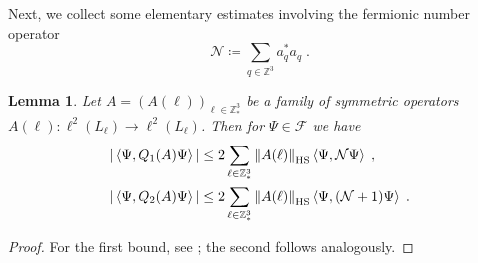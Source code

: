 \documentclass[12pt,a4paper]{article}
\numberwithin{equation}{section}
\newcommand{\cF}{\mathcal{F}}
\newcommand{\cN}{\mathcal{N}}
\newcommand{\1}{\mathbb{I}}
\newcommand{\HS}{\mathrm{HS}}
\newcommand{\Z}{\mathbb{Z}}
\newcommand{\NN}{\mathcal{N}}
\newcommand{\half}{\frac{1}{2}}
\newcommand{\eva}[1]{\left\langle #1 \right\rangle}
\theoremstyle{plain}
\newtheorem{lemma}[theorem]{Lemma}
\theoremstyle{definition}
\theoremstyle{remark}
\theoremstyle{plain}
\theoremstyle{definition}
\theoremstyle{remark}
\begin{document}
Next, we collect some elementary estimates involving the fermionic number operator
\begin{equation} \label{eq:cN}
	\cN \coloneq \sum_{q \in \Z^3} a_q^* a_q \;.
\end{equation}
%


\begin{lemma}\label{lem:estQ2}
Let $A = (A(\ell))_{\ell \in \Z^3_*}$ be a family of symmetric operators $ A(\ell) : \ell^2(L_\ell) \to \ell^2(L_\ell) $. Then for $ \Psi \in \cF $ we have
\begin{equation} \label{eq:Qest}
\begin{aligned}
	|\eva{\Psi,Q_1(A)\Psi}|
	&\leq 2\sum_{\ell\in \Z^3_*}\norm{A(\ell)}_{\HS}\eva{\Psi,\mathcal{N} \Psi} \;, \\
	|\eva{\Psi,Q_2(A)\Psi}|
	&\leq 2\sum_{\ell\in \Z^3_*}\norm{A(\ell)}_{\HS}\eva{\Psi,(\mathcal{N}+1) \Psi} \;.
\end{aligned}
\end{equation}
\end{lemma}

\begin{proof}
For the first bound, see \cite[Prop.~4.7]{CHN21}; the second follows analogously.
\end{proof}
\end{document}
